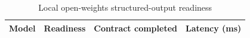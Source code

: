 
\begin{table}[htbp]
\centering
\caption{Local open-weights structured-output readiness}
\label{tab:local-model-readiness}
\begin{tabular}{llll}
\hline
Model & Readiness & Contract completed & Latency (ms) \\
\hline
\hline
\end{tabular}
\end{table}
